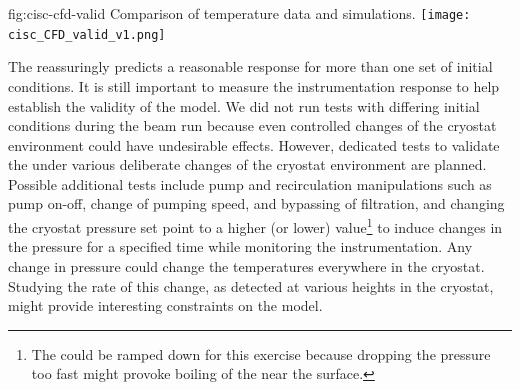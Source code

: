 \begin{dunefigure}{fig:cisc-cfd-valid}
  {Comparison of  temperature data and  simulations.}
  \texttt{[image: cisc\_CFD\_valid\_v1.png]}
\end{dunefigure}


The  reassuringly predicts a
reasonable response for more than one set of initial conditions. It is still important to %
measure the instrumentation response  
to help establish
the validity of the  model. 
We did not run tests with differing initial conditions during the beam run
because even controlled changes of the cryostat environment could have
undesirable effects.   
However, dedicated tests to validate the
 under various deliberate changes of the cryostat
environment are planned. 
Possible additional tests include
pump and recirculation manipulations such as pump on-off, change of pumping speed, and bypassing of filtration, and changing the cryostat pressure set point to
a higher (or lower) value\footnote{The  could be ramped down for
  this exercise because dropping the pressure too fast might provoke
  boiling of the \lar near the surface.} to induce changes in the
pressure for a specified time while
monitoring the instrumentation. Any change in pressure could change
the temperatures everywhere in the cryostat. Studying the rate of this
change, as detected at various heights in the cryostat,
might provide interesting constraints on the  model.

